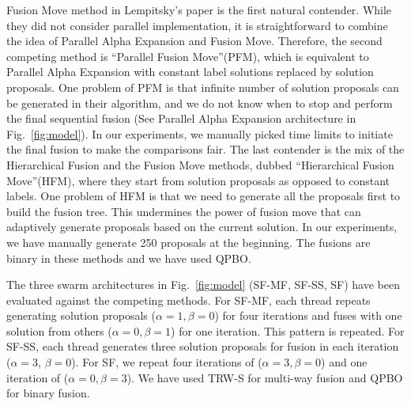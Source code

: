 \noindent Fusion Move method in Lempitsky's paper is the first natural
contender. While they did not consider parallel implementation, it is
straightforward to combine the idea of Parallel Alpha Expansion and
Fusion Move. Therefore, the second competing method is ``Parallel Fusion
Move''(PFM), which is equivalent to Parallel Alpha Expansion with constant
label solutions replaced by solution proposals.
%
One problem of PFM is that infinite number of solution proposals can be
generated in their algorithm, and we do not know when to stop and
perform the final sequential fusion (See Parallel Alpha Expansion
architecture in Fig.~\ref{fig:model}). In our experiments, we manually
picked time limits to initiate the final fusion to make the comparisons
fair.
%
The last contender is the mix of the Hierarchical Fusion and the Fusion
Move methods, dubbed ``Hierarchical Fusion Move''(HFM), where they
start from solution proposals as opposed to constant labels. One problem
of HFM is that we need to generate all the proposals first to build the
fusion tree. This undermines the power of fusion move that can
adaptively generate proposals based on the current solution. In our
experiments, we have manually generate 250 proposals at the
beginning.
The fusions are binary in these methods and we have used QPBO.


\noindent
The three swarm architectures in Fig.~\ref{fig:model} (SF-MF, SF-SS, SF)
have been evaluated against the competing methods. For SF-MF, each
thread repeats generating solution proposals ($\alpha=1, \beta=0$) for
four iterations and fuses with one solution from others ($\alpha=0,
\beta=1$) for one iteration. This pattern is repeated. For SF-SS, each
thread generates three solution proposals for fusion in each iteration
($\alpha=3$, $\beta=0$). For SF, we repeat four iterations of
($\alpha=3, \beta=0$) and  one iteration of ($\alpha=0, \beta=3$).
We have used TRW-S for multi-way fusion and QPBO for binary fusion.
%
%
